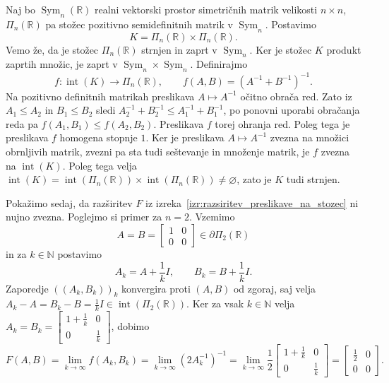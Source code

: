 \documentclass[mat2, tisk]{fmfdelo}
\newcommand{\R}{\mathbb{R}}
\newcommand{\N}{\mathbb{N}}
\begin{document}
\begin{zgled}\label{zgled:nezvezna_razsiritev}
Naj bo $\operatorname{Sym}_n (\R)$ realni vektorski prostor simetričnih
matrik velikosti $n\times n$, $\Pi_n(\R)$ pa stožec pozitivno
semidefinitnih matrik v $\operatorname{Sym}_n$. Postavimo
\begin{equation*}
K=\Pi_n(\R)\times\Pi_n(\R).
\end{equation*}
Vemo že, da je stožec
$\Pi_n(\R)$ strnjen in zaprt v $\operatorname{Sym}_n$. Ker je stožec $K$ produkt zaprtih množic, je zaprt v
$\operatorname{Sym}_n\times\operatorname{Sym}_n$.
Definirajmo
\begin{equation*}
f\colon\operatorname{int}(K)\longrightarrow\Pi_n(\R),
\qquad
f(A,B)=(A^{-1}+B^{-1})^{-1}.
\end{equation*}
Na pozitivno definitnih matrikah preslikava $A\mapsto A^{-1}$ očitno obrača
red. Zato iz $A_1\leq A_2$ in $B_1\leq B_2$ sledi
$A_2^{-1}+B_2^{-1}
\leq
A_1^{-1}+B_1^{-1}$,
po ponovni uporabi obračanja reda pa
$f(A_1,B_1)\leq f(A_2,B_2)$. Preslikava $f$ torej ohranja red.
Poleg tega je preslikava $f$ homogena stopnje $1$.
Ker je preslikava $A\mapsto A^{-1}$ zvezna na množici
obrnljivih matrik, zvezni pa sta tudi seštevanje
in množenje matrik, je $f$ zvezna
na $\operatorname{int}(K)$.
Poleg tega velja
$\operatorname{int}(K) = \operatorname{int}(\Pi_n(\R))
\times
\operatorname{int}(\Pi_n(\R))
\neq\varnothing$,
zato je $K$ tudi strnjen.

Pokažimo sedaj, da razširitev $F$ iz
izreka~\ref{izr:razsiritev_preslikave_na_stozec} ni nujno zvezna. Poglejmo si primer
za $n=2$. Vzemimo
\begin{equation*}
A=B=
\begin{bmatrix}
1&0\\
0&0
\end{bmatrix}
\in\partial\Pi_2(\R)
\end{equation*}
in za $k\in\N$ postavimo
\begin{equation*}
A_k=A+\frac{1}{k}I,
\qquad
B_k=B+\frac{1}{k}I.
\end{equation*}
Zaporedje $((A_k,B_k))_k$ konvergira proti $(A,B)$ od zgoraj, saj velja
$A_k-A=B_k-B=\frac1k I\in\operatorname{int}(\Pi_2(\R))$.
Ker za vsak $k\in\N$ velja $A_k=B_k =
\begin{bmatrix}
1+\frac{1}{k} & 0\\
0 & \frac{1}{k}
\end{bmatrix}$, dobimo
\[
F(A,B)
=
\lim\limits_{k\to\infty} f(A_k,B_k)
= \lim\limits_{k\to\infty} (2A_k^{-1})^{-1}
= \lim\limits_{k\to\infty}
\frac{1}{2}\begin{bmatrix}
1+\frac{1}{k}&0\\
0&\frac{1}{k}
\end{bmatrix}
=
\begin{bmatrix}
\frac12&0\\
0&0
\end{bmatrix}.
\]


\end{zgled}
\end{document}
